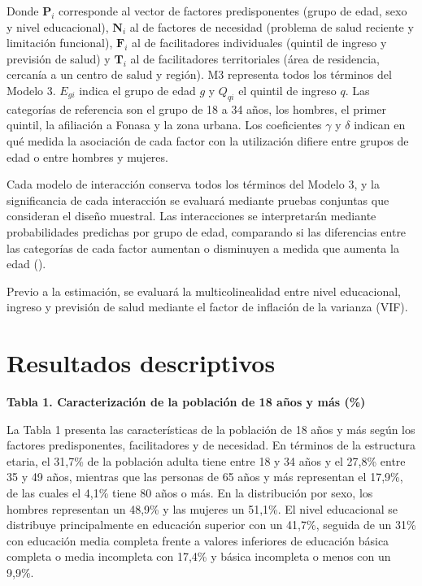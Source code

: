 \documentclass[
  spanish,
  a4paper,
  oneside]{scrbook}
\begin{document}
Donde \(\mathbf{P}_i\) corresponde al vector de factores predisponentes
(grupo de edad, sexo y nivel educacional), \(\mathbf{N}_i\) al de
factores de necesidad (problema de salud reciente y limitación
funcional), \(\mathbf{F}_i\) al de facilitadores individuales (quintil
de ingreso y previsión de salud) y \(\mathbf{T}_i\) al de facilitadores
territoriales (área de residencia, cercanía a un centro de salud y
región). M3 representa todos los términos del Modelo 3. \(E_{gi}\)
indica el grupo de edad \(g\) y \(Q_{qi}\) el quintil de ingreso \(q\).
Las categorías de referencia son el grupo de 18 a 34 años, los hombres,
el primer quintil, la afiliación a Fonasa y la zona urbana. Los
coeficientes \(\gamma\) y \(\delta\) indican en qué medida la asociación
de cada factor con la utilización difiere entre grupos de edad o entre
hombres y mujeres.

Cada modelo de interacción conserva todos los términos del Modelo 3, y
la significancia de cada interacción se evaluará mediante pruebas
conjuntas que consideran el diseño muestral. Las interacciones se
interpretarán mediante probabilidades predichas por grupo de edad,
comparando si las diferencias entre las categorías de cada factor
aumentan o disminuyen a medida que aumenta la edad
().

Previo a la estimación, se evaluará la multicolinealidad entre nivel
educacional, ingreso y previsión de salud mediante el factor de
inflación de la varianza (VIF).


\chapter{Resultados descriptivos}\label{resultados-descriptivos}

\textbf{Tabla 1. Caracterización de la población de 18 años y más (\%)}

La Tabla 1 presenta las características de la población de 18 años y más
según los factores predisponentes, facilitadores y de necesidad. En
términos de la estructura etaria, el 31,7\% de la población adulta tiene
entre 18 y 34 años y el 27,8\% entre 35 y 49 años, mientras que las
personas de 65 años y más representan el 17,9\%, de las cuales el 4,1\%
tiene 80 años o más. En la distribución por sexo, los hombres
representan un 48,9\% y las mujeres un 51,1\%. El nivel educacional se
distribuye principalmente en educación superior con un 41,7\%, seguida
de un 31\% con educación media completa frente a valores inferiores de
educación básica completa o media incompleta con 17,4\% y básica
incompleta o menos con un 9,9\%.
\end{document}
